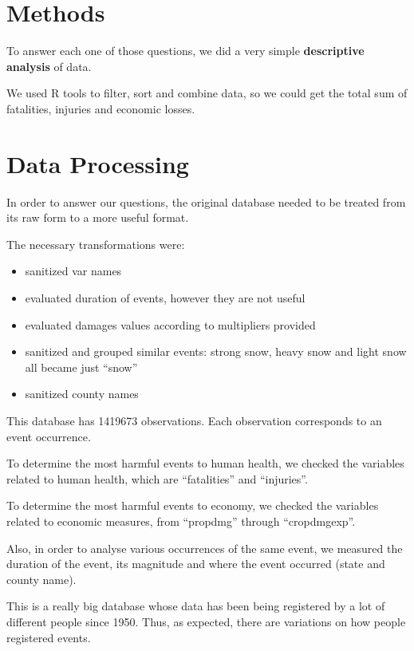 \documentclass[]{article}
\providecommand{\tightlist}{%
  \setlength{\itemsep}{0pt}\setlength{\parskip}{0pt}}
\begin{document}
\section{Methods}\label{methods}

To answer each one of those questions, we did a very simple
\textbf{descriptive analysis} of data.

We used R tools to filter, sort and combine data, so we could get the
total sum of fatalities, injuries and economic losses.

\section{Data Processing}\label{data-processing}

In order to answer our questions, the original database needed to be
treated from its raw form to a more useful format.

The necessary transformations were:

\begin{itemize}
\tightlist
\item
  sanitized var names
\item
  evaluated duration of events, however they are not useful
\item
  evaluated damages values according to multipliers provided
\item
  sanitized and grouped similar events: strong snow, heavy snow and
  light snow all became just ``snow''
\item
  sanitized county names
\end{itemize}

This database has 1419673 observations. Each observation corresponds to
an event occurrence.

To determine the most harmful events to human health, we checked the
variables related to human health, which are ``fatalities'' and
``injuries''.

To determine the most harmful events to economy, we checked the
variables related to economic measures, from ``propdmg'' through
``cropdmgexp''.

Also, in order to analyse various occurrences of the same event, we
measured the duration of the event, its magnitude and where the event
occurred (state and county name).

This is a really big database whose data has been being registered by a
lot of different people since 1950. Thus, as expected, there are
variations on how people registered events.
\end{document}
